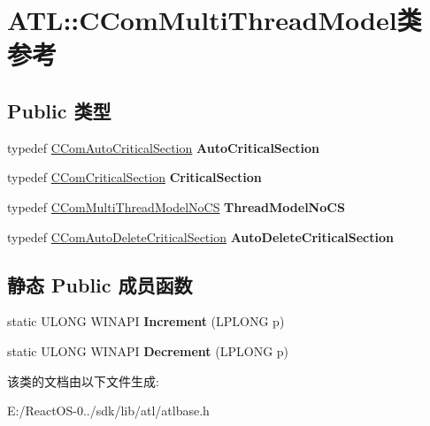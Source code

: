 \hypertarget{class_a_t_l_1_1_c_com_multi_thread_model}{}\section{A\+TL\+:\+:C\+Com\+Multi\+Thread\+Model类 参考}
\label{class_a_t_l_1_1_c_com_multi_thread_model}
\subsection*{Public 类型}
\begin{DoxyCompactItemize}
\item 
\mbox{\label{class_a_t_l_1_1_c_com_multi_thread_model_af311e2f32f4ed954777a73f24d453f2b}} 
typedef \hyperlink{class_a_t_l_1_1_c_com_auto_critical_section}{C\+Com\+Auto\+Critical\+Section} {\bfseries Auto\+Critical\+Section}
\item 
\mbox{\label{class_a_t_l_1_1_c_com_multi_thread_model_a658dd3f98bcf2def8ff385eb6991499f}} 
typedef \hyperlink{class_a_t_l_1_1_c_com_critical_section}{C\+Com\+Critical\+Section} {\bfseries Critical\+Section}
\item 
\mbox{\label{class_a_t_l_1_1_c_com_multi_thread_model_a7b3a63c4a2f15244ab7124611024705c}} 
typedef \hyperlink{class_a_t_l_1_1_c_com_multi_thread_model_no_c_s}{C\+Com\+Multi\+Thread\+Model\+No\+CS} {\bfseries Thread\+Model\+No\+CS}
\item 
\mbox{\label{class_a_t_l_1_1_c_com_multi_thread_model_a71082b349ec854254ab152b3eb430dc7}} 
typedef \hyperlink{class_a_t_l_1_1_c_com_auto_delete_critical_section}{C\+Com\+Auto\+Delete\+Critical\+Section} {\bfseries Auto\+Delete\+Critical\+Section}
\end{DoxyCompactItemize}
\subsection*{静态 Public 成员函数}
\begin{DoxyCompactItemize}
\item 
\mbox{\label{class_a_t_l_1_1_c_com_multi_thread_model_a473ba15303aa41bd2ed459661ef54d40}} 
static U\+L\+O\+NG W\+I\+N\+A\+PI {\bfseries Increment} (L\+P\+L\+O\+NG p)
\item 
\mbox{\label{class_a_t_l_1_1_c_com_multi_thread_model_a04f61a7e148c8bf5cdcd3d13221887fc}} 
static U\+L\+O\+NG W\+I\+N\+A\+PI {\bfseries Decrement} (L\+P\+L\+O\+NG p)
\end{DoxyCompactItemize}


该类的文档由以下文件生成\+:\begin{DoxyCompactItemize}
\item 
E\+:/\+React\+O\+S-\/0../sdk/lib/atl/atlbase.\+h\end{DoxyCompactItemize}
